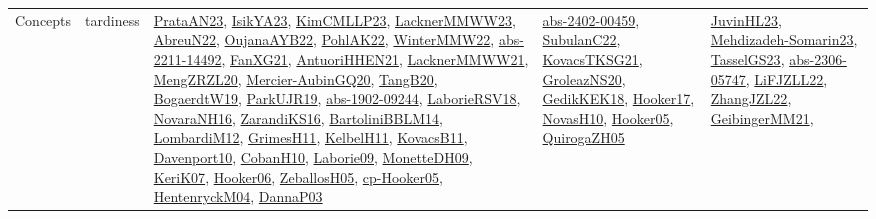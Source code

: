 {\begin{longtable}{lp{3cm}>{\raggedright}p{6cm}>{\raggedright}p{6cm}p{8cm}}
Concepts & tardiness & \href{articles/PrataAN23.pdf}{PrataAN23}\cite{PrataAN23}, \href{articles/IsikYA23.pdf}{IsikYA23}\cite{IsikYA23}, \href{papers/KimCMLLP23.pdf}{KimCMLLP23}\cite{KimCMLLP23}, \href{articles/LacknerMMWW23.pdf}{LacknerMMWW23}\cite{LacknerMMWW23}, \href{articles/AbreuN22.pdf}{AbreuN22}\cite{AbreuN22}, \href{papers/OujanaAYB22.pdf}{OujanaAYB22}\cite{OujanaAYB22}, \href{articles/PohlAK22.pdf}{PohlAK22}\cite{PohlAK22}, \href{papers/WinterMMW22.pdf}{WinterMMW22}\cite{WinterMMW22}, \href{articles/abs-2211-14492.pdf}{abs-2211-14492}\cite{abs-2211-14492}, \href{articles/FanXG21.pdf}{FanXG21}\cite{FanXG21}, \href{papers/AntuoriHHEN21.pdf}{AntuoriHHEN21}\cite{AntuoriHHEN21}, \href{papers/LacknerMMWW21.pdf}{LacknerMMWW21}\cite{LacknerMMWW21}, \href{articles/MengZRZL20.pdf}{MengZRZL20}\cite{MengZRZL20}, \href{papers/Mercier-AubinGQ20.pdf}{Mercier-AubinGQ20}\cite{Mercier-AubinGQ20}, \href{papers/TangB20.pdf}{TangB20}\cite{TangB20}, \href{papers/BogaerdtW19.pdf}{BogaerdtW19}\cite{BogaerdtW19}, \href{papers/ParkUJR19.pdf}{ParkUJR19}\cite{ParkUJR19}, \href{articles/abs-1902-09244.pdf}{abs-1902-09244}\cite{abs-1902-09244}, \href{articles/LaborieRSV18.pdf}{LaborieRSV18}\cite{LaborieRSV18}, \href{articles/NovaraNH16.pdf}{NovaraNH16}\cite{NovaraNH16}, \href{articles/ZarandiKS16.pdf}{ZarandiKS16}\cite{ZarandiKS16}, \href{papers/BartoliniBBLM14.pdf}{BartoliniBBLM14}\cite{BartoliniBBLM14}, \href{articles/LombardiM12.pdf}{LombardiM12}\cite{LombardiM12}, \href{papers/GrimesH11.pdf}{GrimesH11}\cite{GrimesH11}, \href{articles/KelbelH11.pdf}{KelbelH11}\cite{KelbelH11}, \href{articles/KovacsB11.pdf}{KovacsB11}\cite{KovacsB11}, \href{papers/Davenport10.pdf}{Davenport10}\cite{Davenport10}, \href{papers/CobanH10.pdf}{CobanH10}\cite{CobanH10}, \href{papers/Laborie09.pdf}{Laborie09}\cite{Laborie09}, \href{papers/MonetteDH09.pdf}{MonetteDH09}\cite{MonetteDH09}, \href{papers/KeriK07.pdf}{KeriK07}\cite{KeriK07}, \href{articles/Hooker06.pdf}{Hooker06}\cite{Hooker06}, \href{articles/ZeballosH05.pdf}{ZeballosH05}\cite{ZeballosH05}, \href{papers/cp-Hooker05.pdf}{cp-Hooker05}\cite{cp-Hooker05}, \href{papers/HentenryckM04.pdf}{HentenryckM04}\cite{HentenryckM04}, \href{papers/DannaP03.pdf}{DannaP03}\cite{DannaP03} & \href{articles/abs-2402-00459.pdf}{abs-2402-00459}\cite{abs-2402-00459}, \href{articles/SubulanC22.pdf}{SubulanC22}\cite{SubulanC22}, \href{papers/KovacsTKSG21.pdf}{KovacsTKSG21}\cite{KovacsTKSG21}, \href{papers/GroleazNS20.pdf}{GroleazNS20}\cite{GroleazNS20}, \href{articles/GedikKEK18.pdf}{GedikKEK18}\cite{GedikKEK18}, \href{papers/Hooker17.pdf}{Hooker17}\cite{Hooker17}, \href{articles/NovasH10.pdf}{NovasH10}\cite{NovasH10}, \href{articles/Hooker05.pdf}{Hooker05}\cite{Hooker05}, \href{papers/QuirogaZH05.pdf}{QuirogaZH05}\cite{QuirogaZH05} & \href{papers/JuvinHL23.pdf}{JuvinHL23}\cite{JuvinHL23}, \href{papers/Mehdizadeh-Somarin23.pdf}{Mehdizadeh-Somarin23}\cite{Mehdizadeh-Somarin23}, \href{papers/TasselGS23.pdf}{TasselGS23}\cite{TasselGS23}, \href{articles/abs-2306-05747.pdf}{abs-2306-05747}\cite{abs-2306-05747}, \href{papers/LiFJZLL22.pdf}{LiFJZLL22}\cite{LiFJZLL22}, \href{papers/ZhangJZL22.pdf}{ZhangJZL22}\cite{ZhangJZL22}, \href{papers/GeibingerMM21.pdf}{GeibingerMM21}\cite{GeibingerMM21}, 
\end{longtable}}
